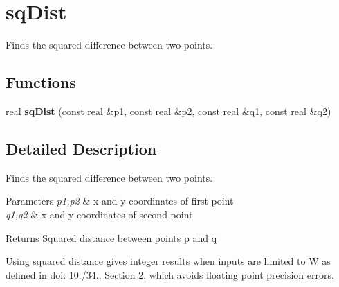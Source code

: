 \hypertarget{group__sqDist}{}\section{sq\+Dist}
\label{group__sqDist}


Finds the squared difference between two points.  


\subsection*{Functions}
\begin{DoxyCompactItemize}
\item 
\mbox{\label{group__sqDist_ga18d0a77f62f604bf2ba74500658add69}} 
\mbox{\hyperlink{typedefs_8cpp_a58a0c7cf2501f4492da833421be92547}{real}} {\bfseries sq\+Dist} (const \mbox{\hyperlink{typedefs_8cpp_a58a0c7cf2501f4492da833421be92547}{real}} \&p1, const \mbox{\hyperlink{typedefs_8cpp_a58a0c7cf2501f4492da833421be92547}{real}} \&p2, const \mbox{\hyperlink{typedefs_8cpp_a58a0c7cf2501f4492da833421be92547}{real}} \&q1, const \mbox{\hyperlink{typedefs_8cpp_a58a0c7cf2501f4492da833421be92547}{real}} \&q2)
\end{DoxyCompactItemize}


\subsection{Detailed Description}
Finds the squared difference between two points. 


\begin{DoxyParams}{Parameters}
{\em p1,p2} & x and y coordinates of first point \\
\hline
{\em q1,q2} & x and y coordinates of second point \\
\hline
\end{DoxyParams}
\begin{DoxyReturn}{Returns}
Squared distance between points p and q
\end{DoxyReturn}
Using squared distance gives integer results when inputs are limited to W as defined in doi\+: 10./34., Section 2. which avoids floating point precision errors. 